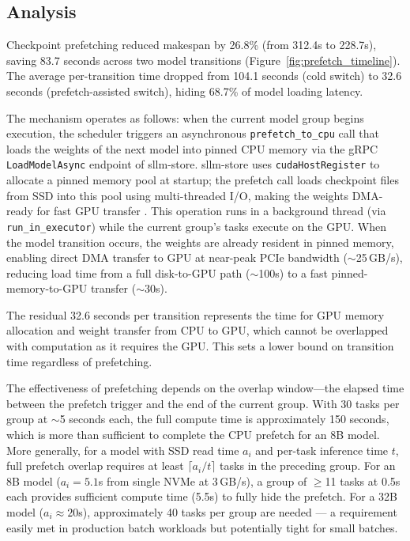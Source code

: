 \documentclass[logo,bsc,singlespacing,parskip,online]{infthesis}
\begin{document}
\subsection{Analysis}

Checkpoint prefetching reduced makespan by 26.8\% (from 312.4s to 228.7s), saving 83.7 seconds across two model transitions (Figure~\ref{fig:prefetch_timeline}). The average per-transition time dropped from 104.1 seconds (cold switch) to 32.6 seconds (prefetch-assisted switch), hiding 68.7\% of model loading latency.

The mechanism operates as follows: when the current model group begins execution, the scheduler triggers an asynchronous \texttt{prefetch\_to\_cpu} call that loads the weights of the next model into pinned CPU memory via the gRPC \texttt{LoadModelAsync} endpoint of sllm-store. sllm-store uses \texttt{cudaHostRegister} to allocate a pinned memory pool at startup; the prefetch call loads checkpoint files from SSD into this pool using multi-threaded I/O, making the weights DMA-ready for fast GPU transfer \citep{cuda_guide2024}. This operation runs in a background thread (via \texttt{run\_in\_executor}) while the current group's tasks execute on the GPU. When the model transition occurs, the weights are already resident in pinned memory, enabling direct DMA transfer to GPU at near-peak PCIe bandwidth ($\sim$25\,GB/s), reducing load time from a full disk-to-GPU path ($\sim$100s) to a fast pinned-memory-to-GPU transfer ($\sim$30s).

The residual 32.6 seconds per transition represents the time for GPU memory allocation and weight transfer from CPU to GPU, which cannot be overlapped with computation as it requires the GPU. This sets a lower bound on transition time regardless of prefetching.

The effectiveness of prefetching depends on the overlap window---the elapsed time between the prefetch trigger and the end of the current group. With 30 tasks per group at $\sim$5 seconds each, the full compute time is approximately 150 seconds, which is more than sufficient to complete the CPU prefetch for an 8B model. More generally, for a model with SSD read time $a_i$ and per-task inference time $t$, full prefetch overlap requires at least $\lceil a_i / t \rceil$ tasks in the preceding group. For an 8B model ($a_i = 5.1$s from single NVMe at 3\,GB/s), a group of $\geq$11 tasks at 0.5s each provides sufficient compute time (5.5s) to fully hide the prefetch. For a 32B model ($a_i \approx 20$s), approximately 40 tasks per group are needed --- a requirement easily met in production batch workloads but potentially tight for small batches.
\end{document}
